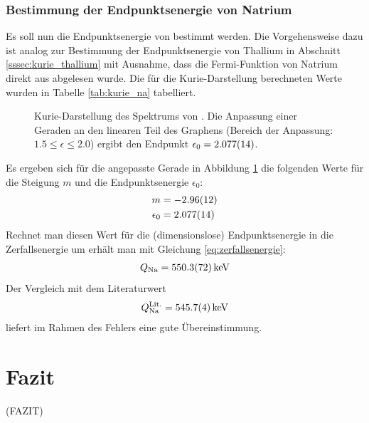 \documentclass[11pt, a4paper]{article}
\numberwithin{equation}{section}
\begin{document}
\subsubsection{Bestimmung der Endpunktsenergie von Natrium}
Es soll nun die Endpunktsenergie von  bestimmt werden.
Die Vorgehensweise dazu ist analog zur Bestimmung der Endpunktsenergie von Thallium in Abschnitt \ref{sssec:kurie_thallium} mit Ausnahme, dass die Fermi-Funktion von Natrium direkt aus \cite{riezler} abgelesen wurde.
Die für die Kurie-Darstellung berechneten Werte wurden in Tabelle \ref{tab:kurie_na} tabelliert.
\begin{figure}[h]
	\centering
	
	\caption{Kurie-Darstellung des Spektrums von . Die Anpassung einer Geraden an den linearen Teil des Graphens (Bereich der Anpassung: $\num{1.5} \leq \epsilon \leq {2.0}$) ergibt den Endpunkt $\epsilon_0 = \num{2.077 +- 0.014}$.}
	\label{fig:natrium_kurie}
\end{figure}
Es ergeben sich für die angepasste Gerade in Abbildung \ref{fig:natrium_kurie} die folgenden Werte für die Steigung $m$ und die Endpunktsenergie $\epsilon_0$:
\begin{align*}
	m &= \num{-2.96+- 0.12} \\
	\epsilon_0 &= \num{2.077 +- 0.014}
\end{align*}
Rechnet man diesen Wert für die (dimensionslose) Endpunktsenergie in die Zerfallsenergie um erhält man mit Gleichung \ref{eq:zerfallsenergie}:
\begin{align*}
Q_\mathrm{Na} = \SI{550.3+-7.2}{\kilo\electronvolt}
\end{align*}
Der Vergleich mit dem Literaturwert \cite{na_literatur}
\begin{align*}
	Q^{\mathrm{Lit.}}_\mathrm{Na} = \SI{545.7 +- 0.4}{\kilo\electronvolt}
\end{align*}
liefert im Rahmen des Fehlers eine gute Übereinstimmung.

\section{Fazit}
(FAZIT)
\end{document}
